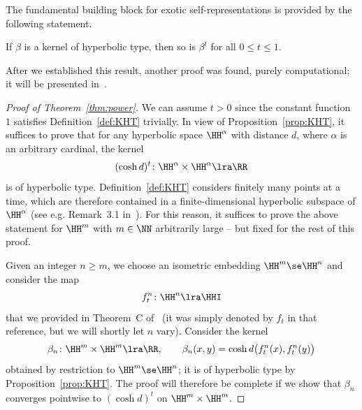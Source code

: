 The fundamental building block for exotic self-representations is provided by the following statement.

\begin{theorem}\label{thm:power}
If $\beta$ is a kernel of hyperbolic type, then so is $\beta^t$ for all $0\leq t\leq 1$.
\end{theorem}

After we established this result, another proof was found, purely computational; it will be presented in~\cite{MonodFHT_arx}.

\begin{proof}[Proof of Theorem~\ref{thm:power}]
We can assume $t>0$ since the constant function~$1$ satisfies Definition~\ref{def:KHT} trivially. In view of Proposition~\ref{prop:KHT}, it suffices to prove that for any hyperbolic space $\HH^\alpha$ with distance $d$, where $\alpha$ is an arbitrary cardinal, the kernel
\[
(\cosh d)^t\colon \HH^\alpha\times \HH^\alpha \lra \RR
\]
is of hyperbolic type. Definition~\ref{def:KHT} considers finitely many points at a time, which are therefore contained in a finite-dimensional hyperbolic subspace of $\HH^\alpha$ (see e.g. Remark~3.1 in~\cite{Burger-Iozzi-Monod}). For this reason, it suffices to prove the above statement for $\HH^m$ with $m\in \NN$ arbitrarily large -- but fixed for the rest of this proof.

Given an integer $n\geq m$, we choose an isometric embedding $\HH^m\se \HH^n$ and consider the map
\[
f^n_t\colon \HH^n \lra \HHI
\]
that we provided in Theorem~C of~\cite{Monod-Py} (it was simply denoted by $f_t$ in that reference, but we will shortly let $n$ vary). Consider the kernel
\[
\beta_n\colon \HH^m \times \HH^m \lra \RR, \qquad \beta_n(x,y) = \cosh d\big(f^n_t(x), f^n_t(y)\big)
\]
obtained by restriction to $\HH^m\se \HH^n$; it is of hyperbolic type by Proposition~\ref{prop:KHT}. The proof will therefore be complete if we show that $\beta_n$ converges pointwise to $(\cosh d)^t$ on $\HH^m \times \HH^m$.


\end{proof}
